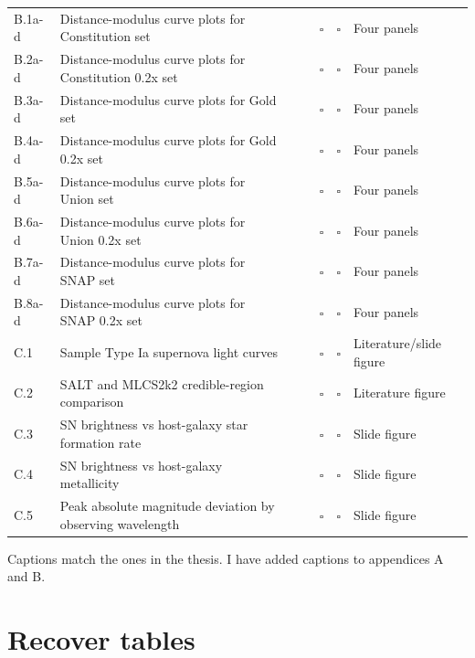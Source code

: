 \documentclass{article}
\newcommand{\done}{\textcolor{green!60!black}{\ding{51}}}
\newcommand{\pending}{$\square$}
\begin{document}
\begin{longtable}{|l|p{4.5cm}|c|c|c|c|p{3cm}|}
B.1a-d & Distance-modulus curve plots for Constitution set & \done & \done & \pending & \pending &  Four panels \\
B.2a-d & Distance-modulus curve plots for Constitution 0.2x set & \done & \done & \pending & \pending &  Four panels \\
B.3a-d & Distance-modulus curve plots for Gold set & \done & \done & \pending & \pending &  Four panels \\
B.4a-d & Distance-modulus curve plots for Gold 0.2x set & \done & \done & \pending & \pending &  Four panels \\
B.5a-d & Distance-modulus curve plots for Union set & \done & \done & \pending & \pending &  Four panels \\
B.6a-d & Distance-modulus curve plots for Union 0.2x set & \done & \done & \pending & \pending &  Four panels \\
B.7a-d & Distance-modulus curve plots for SNAP set & \done & \done & \pending & \pending &  Four panels \\
B.8a-d & Distance-modulus curve plots for SNAP 0.2x set & \done & \done & \pending & \pending &  Four panels \\

C.1 & Sample Type Ia supernova light curves & \done & \done & \pending & \pending &  Literature/slide figure \\
C.2 & SALT and MLCS2k2 credible-region comparison & \done & \done & \pending & \pending &  Literature figure \\
C.3 & SN brightness vs host-galaxy star formation rate & \done & \done & \pending & \pending &  Slide figure \\
C.4 & SN brightness vs host-galaxy metallicity & \done  & \done & \pending & \pending &  Slide figure \\
C.5 & Peak absolute magnitude deviation by observing wavelength & \done & \done & \pending & \pending &  Slide figure \\

\hline
\end{longtable}

Captions match the ones in the thesis.
I have added captions to appendices A and B.

\section{\done Recover tables}
\end{document}
